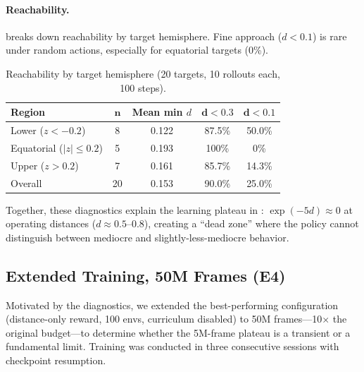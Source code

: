 \documentclass[11pt]{article}
\begin{document}
\paragraph{Reachability.}
 breaks down reachability by target hemisphere.
Fine approach ($d < 0.1$) is rare under random actions, especially for equatorial targets (0\%).

\begin{table}[H]
  \centering
  \small
  \renewcommand{\arraystretch}{1.3}
  \caption{Reachability by target hemisphere (20 targets, 10 rollouts each, 100 steps).}
  \label{tab:reachability}
  \begin{tabular}{@{}lcccc@{}}
    \toprule
    \textbf{Region} & $\boldsymbol{n}$ & \textbf{Mean min $d$} & $\boldsymbol{d < 0.3}$ & $\boldsymbol{d < 0.1}$ \\
    \midrule
    Lower ($z < -0.2$)          & 8  & 0.122 & 87.5\% & 50.0\% \\
    Equatorial ($|z| \leq 0.2$) & 5  & 0.193 & 100\%  & 0\%    \\
    Upper ($z > 0.2$)           & 7  & 0.161 & 85.7\% & 14.3\% \\
    \midrule
    Overall                     & 20 & 0.153 & 90.0\% & 25.0\% \\
    \bottomrule
  \end{tabular}
\end{table}

\noindent
Together, these diagnostics explain the learning plateau in : $\exp(-5d) \approx 0$ at operating distances ($d \approx 0.5$--$0.8$), creating a ``dead zone'' where the policy cannot distinguish between mediocre and slightly-less-mediocre behavior.

\subsection{Extended Training, 50M Frames (E4)}
\label{sec:rl-dismech:extended}

Motivated by the diagnostics, we extended the best-performing configuration (distance-only reward, 100 envs, curriculum disabled) to 50M frames---10$\times$ the original budget---to determine whether the 5M-frame plateau is a transient or a fundamental limit.
Training was conducted in three consecutive sessions with checkpoint resumption.
\end{document}
